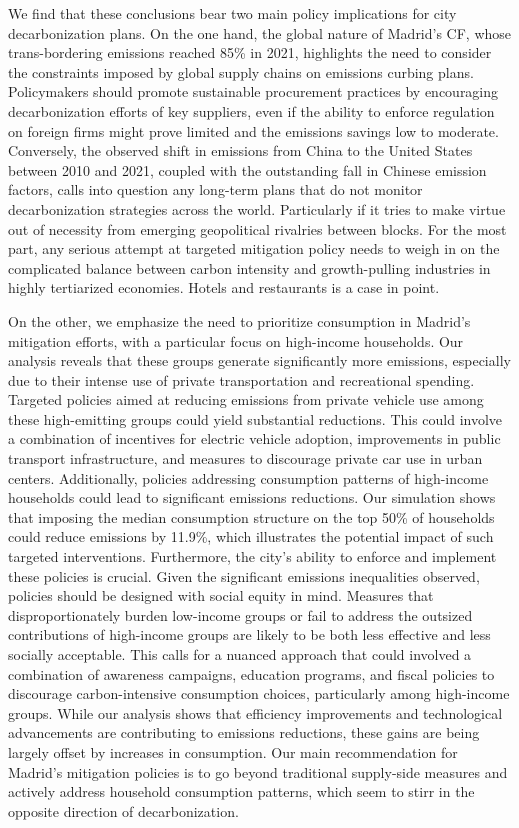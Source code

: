 \documentclass[
  10pt,
  twocolumn]{aft}
\begin{document}
We find that these conclusions bear two main policy implications for
city decarbonization plans. On the one hand, the global nature of
Madrid's CF, whose trans-bordering emissions reached 85\% in 2021,
highlights the need to consider the constraints imposed by global supply
chains on emissions curbing plans. Policymakers should promote
sustainable procurement practices by encouraging decarbonization efforts
of key suppliers, even if the ability to enforce regulation on foreign
firms might prove limited and the emissions savings low to moderate.
Conversely, the observed shift in emissions from China to the United
States between 2010 and 2021, coupled with the outstanding fall in
Chinese emission factors, calls into question any long-term plans that
do not monitor decarbonization strategies across the world. Particularly
if it tries to make virtue out of necessity from emerging geopolitical
rivalries between blocks. For the most part, any serious attempt at
targeted mitigation policy needs to weigh in on the complicated balance
between carbon intensity and growth-pulling industries in highly
tertiarized economies. Hotels and restaurants is a case in point.

On the other, we emphasize the need to prioritize consumption in
Madrid's mitigation efforts, with a particular focus on high-income
households. Our analysis reveals that these groups generate
significantly more emissions, especially due to their intense use of
private transportation and recreational spending. Targeted policies
aimed at reducing emissions from private vehicle use among these
high-emitting groups could yield substantial reductions. This could
involve a combination of incentives for electric vehicle adoption,
improvements in public transport infrastructure, and measures to
discourage private car use in urban centers. Additionally, policies
addressing consumption patterns of high-income households could lead to
significant emissions reductions. Our simulation shows that imposing the
median consumption structure on the top 50\% of households could reduce
emissions by 11.9\%, which illustrates the potential impact of such
targeted interventions. Furthermore, the city's ability to enforce and
implement these policies is crucial. Given the significant emissions
inequalities observed, policies should be designed with social equity in
mind. Measures that disproportionately burden low-income groups or fail
to address the outsized contributions of high-income groups are likely
to be both less effective and less socially acceptable. This calls for a
nuanced approach that could involved a combination of awareness
campaigns, education programs, and fiscal policies to discourage
carbon-intensive consumption choices, particularly among high-income
groups. While our analysis shows that efficiency improvements and
technological advancements are contributing to emissions reductions,
these gains are being largely offset by increases in consumption. Our
main recommendation for Madrid's mitigation policies is to go beyond
traditional supply-side measures and actively address household
consumption patterns, which seem to stirr in the opposite direction of
decarbonization.
\end{document}
